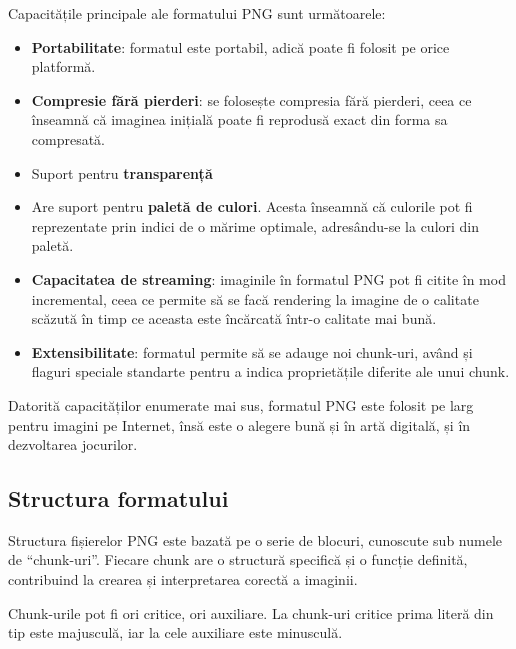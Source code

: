 \documentclass[a4paper,12pt]{report}
\begin{document}
Capacitățile principale ale formatului PNG sunt următoarele:
\begin{itemize}
  \item 
  \textbf{Portabilitate}: formatul este portabil, adică poate fi folosit pe orice platformă.

  \item 
  \textbf{Compresie fără pierderi}: se folosește compresia fără pierderi,
  ceea ce înseamnă că imaginea inițială poate fi reprodusă exact din forma sa compresată.

  \item
  Suport pentru \textbf{transparență}

  \item
  Are suport pentru \textbf{paletă de culori}.
  Acesta înseamnă că culorile pot fi reprezentate prin indici de o mărime optimale,
  adresându-se la culori din paletă.
  
  \item
  \textbf{Capacitatea de streaming}: imaginile în formatul PNG pot fi citite în mod incremental,
  ceea ce permite să se facă rendering la imagine de o calitate scăzută în timp ce 
  aceasta este încărcată într-o calitate mai bună.

  \item
  \textbf{Extensibilitate}: formatul permite să se adauge noi chunk-uri,
  având și flaguri speciale standarte pentru a indica proprietățile diferite ale unui chunk.
\end{itemize}

Datorită capacităților enumerate mai sus, formatul PNG este folosit
pe larg pentru imagini pe Internet,
însă este o alegere bună și în artă digitală, și în dezvoltarea jocurilor.


\subsection{Structura formatului}

Structura fișierelor PNG este bazată pe o serie de blocuri,
cunoscute sub numele de ``chunk-uri''.
Fiecare chunk are o structură specifică și o funcție definită,
contribuind la crearea și interpretarea corectă a imaginii.

Chunk-urile pot fi ori critice, ori auxiliare.
La chunk-uri critice prima literă din tip este majusculă,
iar la cele auxiliare este minusculă.
\end{document}
